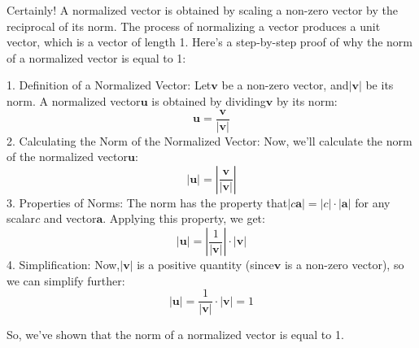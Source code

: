 \documentclass{article}
\begin{document}
Certainly! A normalized vector is obtained by scaling a non-zero vector by the reciprocal of its norm. The process of normalizing a vector produces a unit vector, which is a vector of length 1. Here’s a step-by-step proof of why the norm of a normalized vector is equal to 1:

	1.	Definition of a Normalized Vector:
Let$\mathbf{v}$ be a non-zero vector, and$|\mathbf{v}|$ be its norm. A normalized vector$\mathbf{u}$ is obtained by dividing$\mathbf{v}$ by its norm:
$$\mathbf{u} = \frac{\mathbf{v}}{|\mathbf{v}|}$$
	2.	Calculating the Norm of the Normalized Vector:
Now, we’ll calculate the norm of the normalized vector$\mathbf{u}$:
$$|\mathbf{u}| = \left|\frac{\mathbf{v}}{|\mathbf{v}|}\right|$$
	3.	Properties of Norms:
The norm has the property that$|c\mathbf{a}| = |c| \cdot |\mathbf{a}|$ for any scalar$c$ and vector$\mathbf{a}$. Applying this property, we get:
$$|\mathbf{u}| = \left|\frac{1}{|\mathbf{v}|}\right| \cdot |\mathbf{v}|$$
	4.	Simplification:
Now,$|\mathbf{v}|$ is a positive quantity (since$\mathbf{v}$ is a non-zero vector), so we can simplify further:
$$|\mathbf{u}| = \frac{1}{|\mathbf{v}|} \cdot |\mathbf{v}| = 1$$

So, we’ve shown that the norm of a normalized vector is equal to 1.
\end{document}

